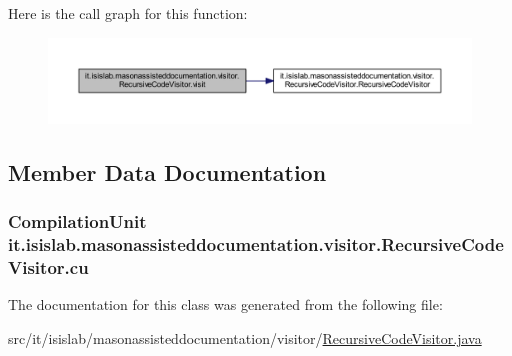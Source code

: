 Here is the call graph for this function\-:\nopagebreak
\begin{figure}[H]
\begin{center}
\leavevmode
\includegraphics[width=350pt]{classit_1_1isislab_1_1masonassisteddocumentation_1_1visitor_1_1_recursive_code_visitor_ae3a05eadf37fa7680eeb661ed7ca1b8c_cgraph}
\end{center}
\end{figure}




\subsection{Member Data Documentation}
\hypertarget{classit_1_1isislab_1_1masonassisteddocumentation_1_1visitor_1_1_recursive_code_visitor_a1adf4bdd3390549bd3e631365b5033c3}{
\subsubsection[{cu}]{\setlength{\rightskip}{0pt plus 5cm}Compilation\-Unit it.\-isislab.\-masonassisteddocumentation.\-visitor.\-Recursive\-Code\-Visitor.\-cu\hspace{0.3cm}{\ttfamily [private]}}}\label{classit_1_1isislab_1_1masonassisteddocumentation_1_1visitor_1_1_recursive_code_visitor_a1adf4bdd3390549bd3e631365b5033c3}


The documentation for this class was generated from the following file\-:\begin{DoxyCompactItemize}
\item 
src/it/isislab/masonassisteddocumentation/visitor/\hyperlink{_recursive_code_visitor_8java}{Recursive\-Code\-Visitor.\-java}\end{DoxyCompactItemize}
